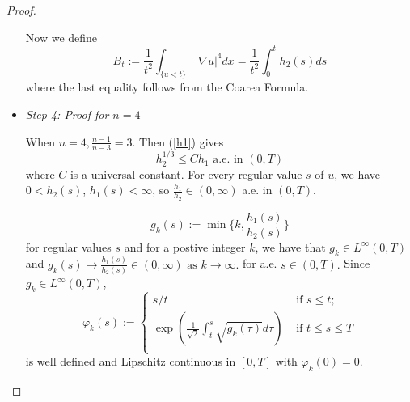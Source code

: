 \documentclass[paper=a4, fontsize=11pt]{scrartcl} %
\numberwithin{equation}{section} %
\numberwithin{figure}{section} %
\numberwithin{table}{section} %
\numberwithin{exercise}{section}
\begin{document}
\begin{proof}
\begin{itemize}
Now we define 
$$B_t:=\frac{1}{t^2}\int_{\{u<t\}} |\nabla u|^4 dx =\frac{1}{t^2}\int_{0}^t h_2(s) ds$$
where the last equality follows from the Coarea Formula.
\item \emph{Step 4: Proof for $n=4$}

When $n=4, \frac{n-1}{n-3}=3.$ Then (\ref{h1}) gives 
\begin{equation}\label{h1h2}
h_2^{1/3}\leq Ch_1  \mbox{ a.e.  in } (0,T) 
\end{equation}
where $C$ is a universal constant.
For every regular value $s$ of $u$, we have $0<h_2(s)$, $h_1(s)<\infty$, so $\frac{h_1}{h_2}\in (0,\infty)$ a.e.  in $(0,T)$.

$$g_k(s):=\min\{ k,\frac{h_1(s)}{h_2(s)} \}$$
for regular values $s$ and for a postive integer $k$, we have that $g_k\in L^\infty (0,T)$ and  $g_k(s) \to \frac{h_1(s)}{h_2(s)}\in (0, \infty) \mbox{ as } k\to
\infty.$ for a.e. $s\in(0,T).$
Since $g_k\in L^\infty (0,T)$,
$$\varphi_k(s):=\begin{cases} s/t   & \mbox{ if } s\leq t; \\
\exp\left(\frac{1}{\sqrt{2}}\int_{t}^s \sqrt{g_k(\tau)} d\tau\right)   &\mbox{ if } t\leq s\leq T\\
\end{cases}$$
is well defined and Lipschitz continuous in $[0,T]$ with $ \varphi_k(0)=0.$


\end{itemize}
\end{proof}
\end{document}
